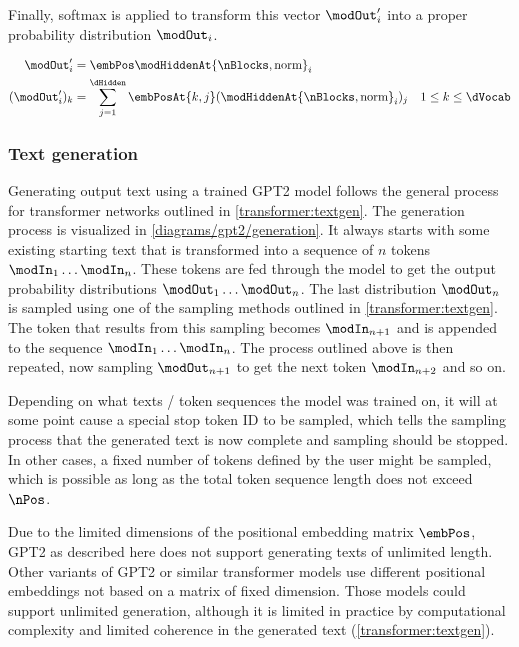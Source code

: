 Finally, softmax is applied to transform this vector $\modOut'_i$ into a proper probability distribution $\modOut_i$.

\begin{align}
	\modOut'_i &= \embPos \modHiddenAt{\nBlocks, \textrm{norm}}_i
	\label{eq:postproc}
	\\
	(\modOut'_i)_k &= \sum_{j=1}^{\dHidden}{\embPosAt{k,j} (\modHiddenAt{\nBlocks, \textrm{norm}}_i)_j} & 1 \leq k \leq \dVocab
	\label{eq:postproc_detailed}
\end{align}



\subsubsection{Text generation}
\label{gpt2:textgen}

Generating output text using a trained GPT2 model follows the general process for transformer networks outlined in \cref{transformer:textgen}.
The generation process is visualized in \cref{diagrams/gpt2/generation}. It always starts with some existing starting text that is transformed into a sequence of $n$ tokens $\modIn_1 \ldots \modIn_n$. These tokens are fed through the model to get the output probability distributions $\modOut_1 \ldots \modOut_n$. The last distribution $\modOut_n$ is sampled using one of the sampling methods outlined in \cref{transformer:textgen}. The token that results from this sampling becomes $\modIn_{n+1}$ and is appended to the sequence $\modIn_1 \ldots \modIn_n$. The process outlined above is then repeated, now sampling $\modOut_{n+1}$ to get the next token $\modIn_{n+2}$ and so on.

Depending on what texts / token sequences the model was trained on, it will at some point cause a special stop token ID to be sampled, which tells the sampling process that the generated text is now complete and sampling should be stopped.
In other cases, a fixed number of tokens defined by the user might be sampled, which is possible as long as the total token sequence length does not exceed $\nPos$.

Due to the limited dimensions of the positional embedding matrix $\embPos$, GPT2 as described here does not support generating texts of unlimited length. Other variants of GPT2 or similar transformer models use different positional embeddings not based on a matrix of fixed dimension. Those models could support unlimited generation, although it is limited in practice by computational complexity and limited coherence in the generated text (\cref{transformer:textgen}).

